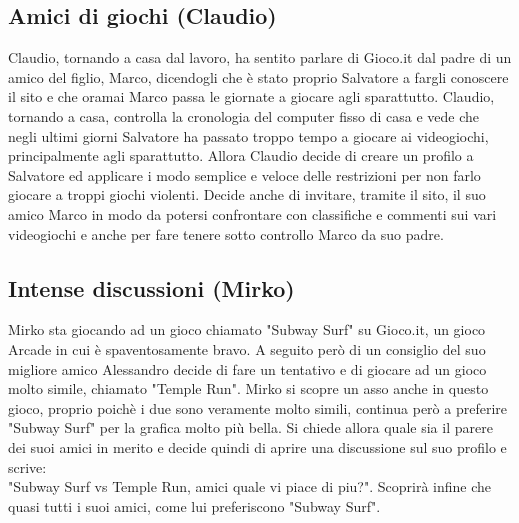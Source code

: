 \documentclass[../Report.tex]{subfiles}
\begin{document}
    \subsection{Amici di giochi (Claudio)}
    Claudio, tornando a casa dal lavoro, ha sentito parlare di Gioco.it dal padre di un amico del figlio, Marco, dicendogli che è stato proprio Salvatore a fargli conoscere il sito e che oramai Marco passa le giornate a giocare agli sparattutto. Claudio, tornando a casa, controlla la cronologia del computer fisso di casa e vede che negli ultimi giorni Salvatore ha passato troppo tempo a giocare ai videogiochi, principalmente agli sparattutto. Allora Claudio decide di creare un profilo a Salvatore ed applicare i modo semplice e veloce delle restrizioni per non farlo giocare a troppi giochi violenti. Decide anche di invitare, tramite il sito, il suo amico Marco in modo da potersi confrontare con classifiche e commenti sui vari videogiochi e anche per fare tenere sotto controllo Marco da suo padre.


    \subsection{Intense discussioni (Mirko)}
    Mirko sta giocando ad un gioco chiamato "Subway Surf" su Gioco.it, un gioco Arcade in cui è spaventosamente bravo. A seguito però di un consiglio del suo migliore amico Alessandro decide di fare un tentativo e di giocare ad un gioco molto simile, chiamato "Temple Run". Mirko si scopre un asso anche in questo gioco, proprio poichè i due sono veramente molto simili, continua però a preferire "Subway Surf" per la grafica molto più bella. Si chiede allora quale sia il parere dei suoi amici in merito e decide quindi di aprire una discussione sul suo profilo e scrive:\\
    "Subway Surf vs Temple Run, amici quale vi piace di piu?". Scoprirà infine che quasi tutti i suoi amici, come lui preferiscono "Subway Surf".
\end{document}
